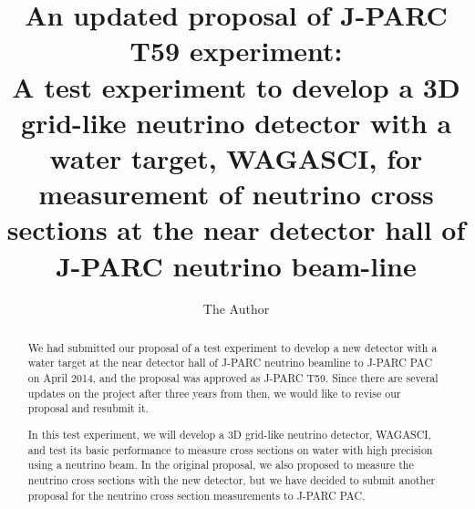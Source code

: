 \documentclass[11pt, oneside]{article}   	%
\title{An updated proposal of J-PARC T59 experiment:\\
A test experiment to develop a 3D grid-like neutrino detector
with a water target, WAGASCI, for measurement of neutrino cross sections
at the near detector hall of J-PARC neutrino beam-line}
\author{The Author}
\begin{document}
\linenumbers
\maketitle

\begin{abstract}
We had submitted our proposal of a test experiment to develop a new detector with a water target
at the near detector hall of J-PARC neutrino beamline to J-PARC PAC on April 2014, 
and the proposal was approved as J-PARC T59.
Since there are several updates on the project after three years from then, 
we would like to revise our proposal and resubmit it.


In this test experiment, we will develop a 3D grid-like neutrino detector, WAGASCI, and 
test its basic performance to measure cross sections on water with high precision 
using a neutrino beam.
In the original proposal, we also proposed to measure the neutrino cross sections with the new detector,
but we have decided to submit another proposal for the neutrino cross section measurements to J-PARC PAC.
\end{abstract}









\end{document}
